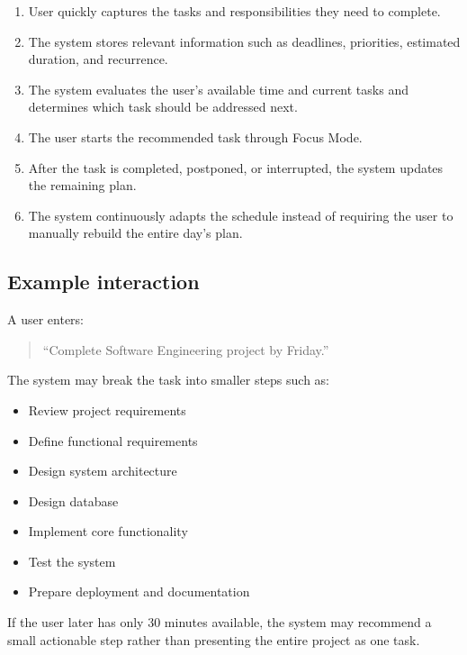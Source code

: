\documentclass[11pt,a4paper]{article}
\begin{document}
\begin{enumerate}[leftmargin=0.7cm]
    \item User quickly captures the tasks and responsibilities they need to
    complete.
    
    \item The system stores relevant information such as deadlines,
    priorities, estimated duration, and recurrence.
    
    \item The system evaluates the user's available time and current tasks
    and determines which task should be addressed next.
    
    \item The user starts the recommended task through Focus Mode.
    
    \item After the task is completed, postponed, or interrupted, the system
    updates the remaining plan.
    
    \item The system continuously adapts the schedule instead of requiring
    the user to manually rebuild the entire day's plan.
\end{enumerate}

\subsection{Example interaction}

A user enters:

\begin{quote}
``Complete Software Engineering project by Friday.''
\end{quote}

The system may break the task into smaller steps such as:

\begin{itemize}[leftmargin=0.7cm]
    \item Review project requirements
    \item Define functional requirements
    \item Design system architecture
    \item Design database
    \item Implement core functionality
    \item Test the system
    \item Prepare deployment and documentation
\end{itemize}

If the user later has only 30 minutes available, the system may recommend a
small actionable step rather than presenting the entire project as one task.
\end{document}
